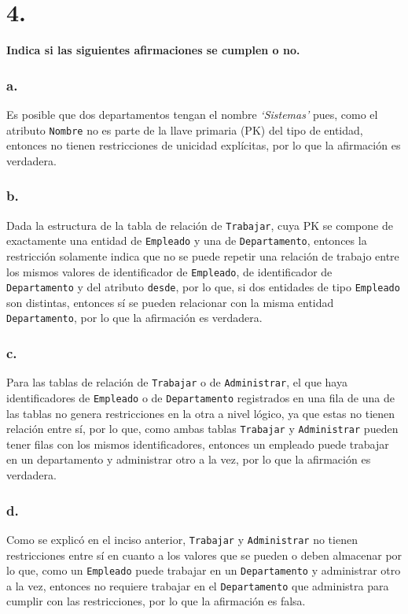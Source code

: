\section*{4.}

\textbf{Indica si las siguientes afirmaciones se cumplen o no.}

\subsubsection*{a.}
Es posible que dos departamentos tengan el nombre \textit{`Sistemas'} pues, como el atributo \texttt{Nombre} no es parte de la llave primaria (PK) del tipo de entidad, entonces no tienen restricciones de unicidad explícitas, por lo que la afirmación es verdadera.

\subsubsection*{b.}
Dada la estructura de la tabla de relación de \texttt{Trabajar}, cuya PK se compone de exactamente una entidad de \texttt{Empleado} y una de \texttt{Departamento}, entonces la restricción solamente indica que no se puede repetir una relación de trabajo entre los mismos valores de identificador de \texttt{Empleado}, de identificador de \texttt{Departamento} y del atributo \texttt{desde}, por lo que, si dos entidades de tipo \texttt{Empleado} son distintas, entonces sí se pueden relacionar con la misma entidad \texttt{Departamento}, por lo que la afirmación es verdadera.

\subsubsection*{c.}
Para las tablas de relación de \texttt{Trabajar} o de \texttt{Administrar}, el que haya identificadores de \texttt{Empleado} o de \texttt{Departamento} registrados en una fila de una de las tablas no genera restricciones en la otra a nivel lógico, ya que estas no tienen relación entre sí, por lo que, como ambas tablas \texttt{Trabajar} y \texttt{Administrar} pueden tener filas con los mismos identificadores, entonces un empleado puede trabajar en un departamento y administrar otro a la vez, por lo que la afirmación es verdadera.

\subsubsection*{d.}
Como se explicó en el inciso anterior, \texttt{Trabajar} y \texttt{Administrar} no tienen restricciones entre sí en cuanto a los valores que se pueden o deben almacenar por lo que, como un \texttt{Empleado} puede trabajar en un \texttt{Departamento} y administrar otro a la vez, entonces no requiere trabajar en el \texttt{Departamento} que administra para cumplir con las restricciones, por lo que la afirmación es falsa.

